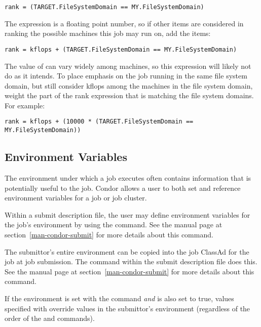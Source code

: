 \footnotesize
\begin{verbatim}
rank = (TARGET.FileSystemDomain == MY.FileSystemDomain)
\end{verbatim}
\normalsize

The  expression is a floating point number, so if 
other items are considered in ranking the possible machines this job
may run on, add the items:

\footnotesize
\begin{verbatim}
rank = kflops + (TARGET.FileSystemDomain == MY.FileSystemDomain)
\end{verbatim}
\normalsize

The value of  can vary widely among machines,
so this  expression will likely not do as it intends.
To place emphasis on the job running in the same file
system domain,
but still consider kflops among the machines in the file system domain,
weight the part of the rank expression that is matching the file system domains.
For example: 

\footnotesize
\begin{verbatim}
rank = kflops + (10000 * (TARGET.FileSystemDomain == MY.FileSystemDomain))
\end{verbatim}
\normalsize

\subsection{Environment Variables}

The environment under which a job executes often contains
information that is potentially useful to the job.
Condor allows a user to both set and reference environment
variables for a job or job cluster.

Within a submit description file, the user may define environment
variables for the job's environment by using the 
 command.
See the  manual page at
section~\ref{man-condor-submit} for more details about this command.

The submittor's entire environment can be copied into the job
ClassAd for the job at job submission.
The  command within the submit description file
does this.
See the  manual page at
section~\ref{man-condor-submit} for more details about this command.

If the environment is set with the  command \emph{and}
 is also set to true, values specified with
 override values in the submittor's environment
(regardless of the order of the  and 
commands).

